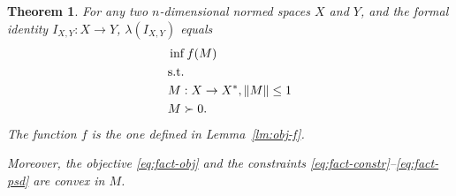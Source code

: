 \documentclass{article}
\newtheorem{theorem}{Theorem}
\begin{document}
\begin{theorem}\label{thm:fact-convex}
  For any two $n$-dimensional normed spaces $X$ and $Y$, and the
  formal identity $I_{X,Y}:X \to Y$, $\lambda(I_{X,Y})$ equals
  \begin{align}
    &\inf %
    f(M)  \label{eq:fact-obj}\\
    &\text{s.t.}\notag\\
    &M: X \to X^*,\|M\| \le 1\label{eq:fact-constr}\\
    &M \succ 0.\label{eq:fact-psd}
  \end{align}
  The function $f$ is the one defined in Lemma~\ref{lm:obj-f}.

  Moreover, the objective \eqref{eq:fact-obj} and the constraints
  \eqref{eq:fact-constr}--\eqref{eq:fact-psd} are convex in $M$.
\end{theorem}
\end{document}

